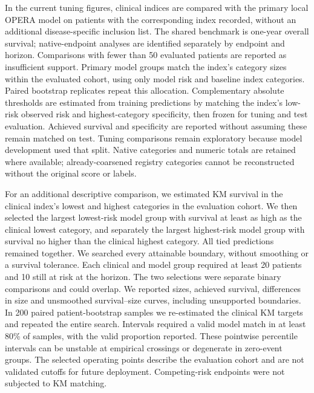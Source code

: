In the current tuning figures, clinical indices are compared with the primary
local OPERA model on patients with the corresponding index recorded, without
an additional disease-specific inclusion list. The shared benchmark is
one-year overall survival; native-endpoint analyses are identified separately
by endpoint and horizon. Comparisons with fewer than 50 evaluated patients are
reported as insufficient support. Primary model groups match the index's category
sizes within the evaluated cohort, using only model risk and baseline index
categories. Paired bootstrap replicates repeat this allocation. Complementary
absolute thresholds are estimated from training predictions by matching the
index's low-risk observed risk and highest-category specificity, then frozen
for tuning and test evaluation. Achieved survival and specificity are reported
without assuming these remain matched on test. Tuning comparisons remain
exploratory because model development used that split. Native categories and numeric totals
are retained where available; already-coarsened registry categories cannot be
reconstructed without the original score or labels.

For an additional descriptive comparison, we estimated KM survival in the
clinical index's lowest and highest categories in the evaluation cohort. We
then selected the largest lowest-risk model group with survival at least as
high as the clinical lowest category, and separately the largest highest-risk
model group with survival no higher than the clinical highest category. All
tied predictions remained together. We searched every attainable boundary,
without smoothing or a survival tolerance. Each clinical and model group
required at least 20 patients and 10 still at risk at the horizon. The two
selections were separate binary comparisons and could overlap. We reported
sizes, achieved survival, differences in size and unsmoothed survival--size
curves, including unsupported boundaries. In 200 paired patient-bootstrap
samples we re-estimated the clinical KM targets and repeated the entire search.
Intervals required a valid model match in at least 80\% of samples, with the
valid proportion reported. These pointwise percentile intervals can be unstable
at empirical crossings or degenerate in zero-event groups. The selected
operating points describe the evaluation cohort and are not validated cutoffs
for future deployment. Competing-risk endpoints were not subjected to KM
matching.

